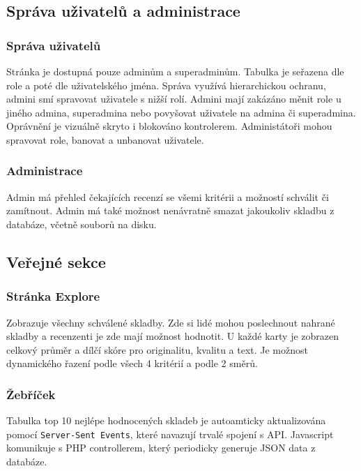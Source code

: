 \documentclass[12pt, a4paper]{article}
\begin{document}
\subsection{Správa uživatelů a administrace}
\subsubsection{Správa uživatelů}
Stránka je dostupná pouze adminům a superadminům.
Tabulka je seřazena dle role a poté dle uživatelského jména.
Správa využívá hierarchickou ochranu, admini smí spravovat uživatele s nižší rolí.
Admini mají zakázáno měnit role u jiného admina, superadmina nebo povyšovat uživatele na admina či superadmina.
Oprávnění je vizuálně skryto i blokováno kontrolerem.
Administátoři mohou spravovat role, banovat a unbanovat uživatele.

\subsubsection{Administrace}
Admin má přehled čekajících recenzí se všemi kritérii a možností schválit či zamítnout.
Admin má také možnost nenávratně smazat jakoukoliv skladbu z databáze, včetně souborů na disku.

\subsection{Veřejné sekce}
\subsubsection{Stránka Explore}
Zobrazuje všechny schválené skladby. Zde si lidé mohou poslechnout nahrané skladby a recenzenti je zde mají možnost hodnotit.
U každé karty je zobrazen celkový průměr a dílčí skóre pro originalitu, kvalitu a text.
Je možnost dynamického řazení podle všech 4 kritérií a podle 2 směrů.

\subsubsection{Žebříček}
Tabulka top 10 nejlépe hodnocených skladeb je autoamticky aktualizována pomocí \verb|Server-Sent Events|, které navazují trvalé spojení s API.
Javascript komunikuje s PHP controllerem, který periodicky generuje JSON data z databáze.
\end{document}
